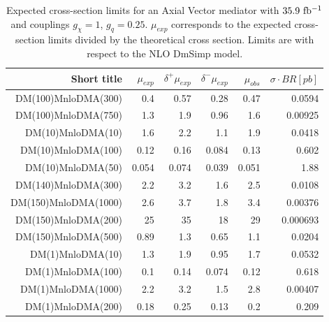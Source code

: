 \begin{table}[hbtp]
  \caption{Expected cross-section limits for an Axial Vector mediator with $35.9~\mathrm{fb^{-1}}$ and couplings $g_\chi=1$, $g_q=0.25$.
  $\mu_{exp}$ corresponds to the expected cross-section limits divided by the theoretical cross section. Limits are with respect to the NLO {\textsc DmSimp} model.}
  \label{tab:axial_limits}
  \begin{center}
{\footnotesize
  \begin{tabular}{rrrrrr}
\hline 
Short title               & $\mu_{exp}$  & $\delta^{+}\mu_{exp}$ & $\delta^{-}\mu_{exp}$ & $\mu_{obs}$  & $\sigma \cdot BR [pb]$ \\
\hline
DM(100)MnloDMA(300)       & 0.4          & 0.57         & 0.28         & 0.47         & 0.0594          \\
DM(100)MnloDMA(750)       & 1.3          & 1.9          & 0.96         & 1.6          & 0.00925         \\
DM(10)MnloDMA(10)         & 1.6          & 2.2          & 1.1          & 1.9          & 0.0418          \\
DM(10)MnloDMA(100)        & 0.12         & 0.16         & 0.084        & 0.13         & 0.602           \\
DM(10)MnloDMA(50)         & 0.054        & 0.074        & 0.039        & 0.051        & 1.88            \\
DM(140)MnloDMA(300)       & 2.2          & 3.2          & 1.6          & 2.5          & 0.0108          \\
DM(150)MnloDMA(1000)      & 2.6          & 3.7          & 1.8          & 3.4          & 0.00376         \\
DM(150)MnloDMA(200)       & 25           & 35           & 18           & 29           & 0.000693        \\
DM(150)MnloDMA(500)       & 0.89         & 1.3          & 0.65         & 1.1          & 0.0204          \\
DM(1)MnloDMA(10)          & 1.3          & 1.9          & 0.95         & 1.7          & 0.0532          \\
DM(1)MnloDMA(100)         & 0.1          & 0.14         & 0.074        & 0.12         & 0.618           \\
DM(1)MnloDMA(1000)        & 2.2          & 3.2          & 1.5          & 2.8          & 0.00407         \\
DM(1)MnloDMA(200)         & 0.18         & 0.25         & 0.13         & 0.2          & 0.209           \\

\end{tabular}}
\end{center}
\end{table}
